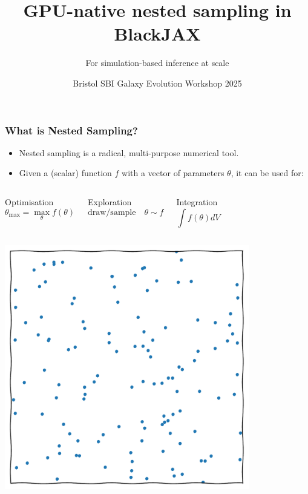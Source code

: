 \documentclass[aspectratio=169]{beamer}
\title{GPU-native nested sampling in BlackJAX}
\subtitle{For simulation-based inference at scale}
\date{Bristol SBI Galaxy Evolution Workshop 2025}
\begin{document}
\begin{frame}
    \titlepage
\end{frame}

\begin{frame}
    \frametitle{What is Nested Sampling?}
    \begin{itemize}
        \item Nested sampling is a radical, multi-purpose numerical tool.
        \item Given a (scalar) function $f$ with a vector of parameters $\theta$, it can be used for:
    \end{itemize}
    \vspace{-10pt}
    \begin{columns}[t]
        \begin{block}{Optimisation}
            \[\theta_\text{max} = \max_\theta{f(\theta)}\]
        \end{block}
        \begin{block}{Exploration}
            \vspace{-10pt}
            \[\text{draw/sample}\quad \theta\sim f\]
            \vspace{-15pt}
        \end{block}
        \begin{block}{Integration}
            \[\int f(\theta) dV \]
        \end{block}
    \end{columns}
    \begin{columns}[t]
        \centerline{\includegraphics[width=0.8\textwidth,page=13]{figures/himmelblau}}

\end{columns}
\end{frame}
\end{document}

